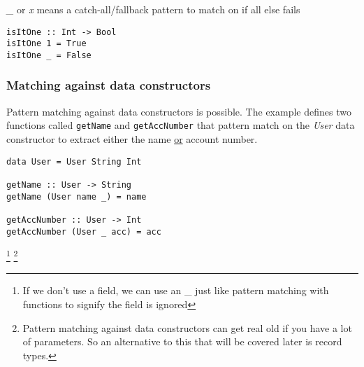 \emph{\_} or \emph{x} means a catch-all/fallback pattern to match on if all else fails

\begin{lstlisting}
isItOne :: Int -> Bool
isItOne 1 = True
isItOne _ = False
\end{lstlisting}

\subsubsection{Matching against data constructors}
Pattern matching against data constructors is possible. The example defines two functions called \texttt{getName} and \texttt{getAccNumber} that
pattern match on the \emph{User} data constructor to extract either the name \underline{or} account number.

\begin{lstlisting}
data User = User String Int

getName :: User -> String
getName (User name _) = name

getAccNumber :: User -> Int
getAccNumber (User _ acc) = acc
\end{lstlisting}

\footnote{If we don't use a field, we can use an \_ just like pattern matching with functions to signify the field is ignored}
\footnote{
    Pattern matching against data constructors can get real old if you have a lot of parameters.
    So an alternative to this that will be covered later is record types.
}